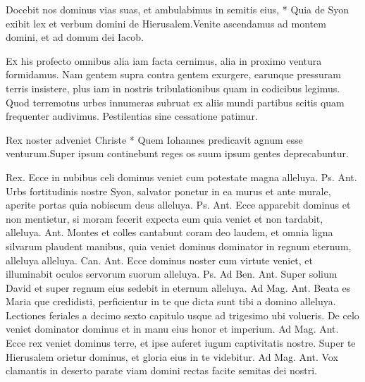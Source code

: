 \begin{multicols*}{2}
\begin{responsory}
{Docebit nos dominus vias suas, et ambulabimus in semitis eius, * Quia de Syon exibit lex et verbum domini de Hierusalem.}{Venite ascendamus ad montem domini, et ad domum dei Iacob.}
\end{responsory}
\lettrine[lines=2]{\zallmancaps \color{Blue} E}{x} his profecto omnibus alia iam facta cernimus, alia in proximo ventura formidamus. Nam gentem supra contra gentem exurgere, earunque pressuram terris insistere, plus iam in nostris tribulationibus quam in codicibus legimus. Quod terremotus urbes innumeras subruat ex aliis mundi partibus scitis quam frequenter audivimus. Pestilentias sine cessatione patimur.
\begin{responsory-doxology}
{Rex noster adveniet Christe * Quem Iohannes predicavit agnum esse venturum.}{Super ipsum continebunt reges os suum ipsum gentes deprecabuntur.}
\end{responsory-doxology}
Rex.
 Ecce in nubibus celi dominus veniet cum potestate magna alleluya. {\color{Red} Ps.}  {\color{Red} Ant.} Urbs fortitudinis nostre Syon, salvator ponetur in ea murus et ante murale, aperite portas quia nobiscum deus alleluya. {\color{Red} Ps.}  {\color{Red} Ant.} Ecce apparebit dominus et non mentietur, si moram fecerit expecta eum quia veniet et non tardabit, alleluya.  {\color{Red} Ant.} Montes et colles cantabunt coram deo laudem, et omnia ligna silvarum plaudent manibus, quia veniet dominus dominator in regnum eternum, alleluya alleluya. {\color{Red} Can.}  {\color{Red} Ant.} Ecce dominus noster cum virtute veniet, et illuminabit oculos servorum suorum alleluya. {\color{Red} Ps.}  {\color{Red} Ad Ben. Ant.} Super solium David et super regnum eius sedebit in eternum alleluya. {\color{Red} Ad Mag. Ant.} Beata es Maria que credidisti, perficientur in te que dicta sunt tibi a domino alleluya.
\newline Lectiones feriales a decimo sexto capitulo usque ad trigesimo ubi volueris.
 De celo veniet dominator dominus et in manu eius honor et imperium. {\color{Red} Ad Mag. Ant.} Ecce rex veniet dominus terre, et ipse auferet iugum captivitatis nostre.
 Super te Hierusalem orietur dominus, et gloria eius in te videbitur. {\color{Red} Ad Mag. Ant.} Vox clamantis in deserto parate viam domini rectas facite semitas dei nostri.

\end{multicols*}
